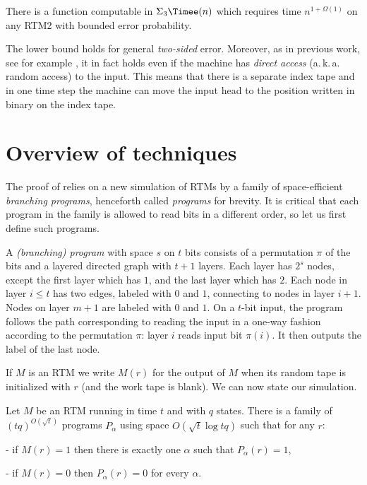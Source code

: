 %
\begin{thm}
\label{thm:RTM2-lb}There is a function computable in $\Sigma_{3}\Timee(n)$
which requires time $n^{1+\Omega(1)}$ on any RTM2 with bounded error
probability.
\end{thm}

The lower bound holds for general \emph{two-sided} error. Moreover,
as in previous work, see for example \cite{DBLP:journals/tcs/MelkebeekR05},
it in fact holds even if the machine has \emph{direct access}
(a.\,k.\,a.   %
random access) to the input. This means that there is a separate index
tape and in one time step the machine can move the input head to the
position written in binary on the index tape.

\section{Overview of techniques \label{sec:Overview-of-techniques}}

The proof of  relies on a new simulation of
RTMs by a family of space-efficient \emph{branching programs}, henceforth
called \emph{programs} for brevity. It is critical that each program
in the family is allowed to read bits in a different order, so let
us first define such programs.
\begin{defn}
A \emph{(branching) program }with space $s$ on $t$ bits consists
of a permutation $\pi$ of the bits and a layered directed graph with
$t+1$ layers. Each layer has $2^{s}$ nodes, except the first layer
which has $1$, and the last layer which has $2$. Each node in layer
$i\le t$ has two edges, labeled with $0$ and $1$, connecting to
nodes in layer $i+1$. Nodes on layer $m+1$ are labeled with $0$
and $1$. On a $t$-bit input, the program follows the path corresponding
to reading the input in a one-way fashion according to the permutation
$\pi$: layer $i$ reads input bit $\pi(i)$. It then outputs the
label of the last node.
\end{defn}

If $M$ is an RTM we write $M(r)$ for the output of $M$ when its
random tape is initialized with $r$ (and the work tape is blank).
We can now state our simulation.
\begin{thm}
\label{thm:M-to-OR-BP}Let $M$ be an RTM running in time $t$ and
with $q$ states. There is a family of $(tq)^{O(\sqrt{t})}$ programs
$P_{\alpha}$ using space $O(\sqrt{t}\log tq)$ such that for any
$r$:

- if $M(r)=1$ then there is exactly one $\alpha$ such that $P_{\alpha}(r)=1$,

- if $M(r)=0$ then $P_{\alpha}(r)=0$ for every $\alpha$.
\end{thm}

